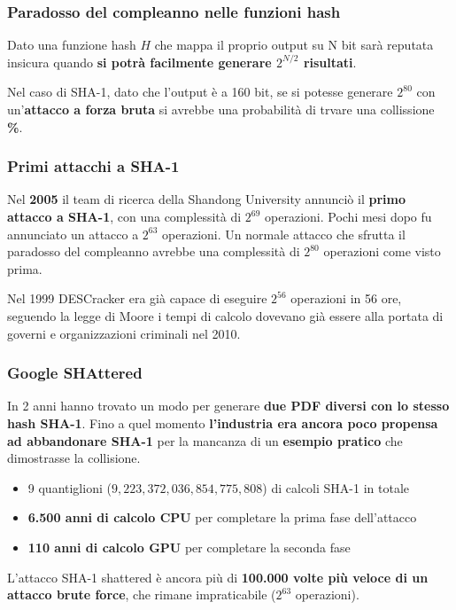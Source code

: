 \begin{frame}
	\frametitle{Paradosso del compleanno nelle funzioni hash}

	Dato una funzione hash \(H\) che mappa il proprio output su N bit sarà reputata insicura quando \textbf{si potrà facilmente generare $2^{N/2}$ risultati}.

	\vspace{1cm}

	Nel caso di SHA-1, dato che l'output è a 160 bit, se si potesse generare $2^{80}$ con un'\textbf{attacco a forza bruta} si avrebbe una probabilità di trvare una collissione \textbf{\%}.
\end{frame}


\begin{frame}
	\frametitle{Primi attacchi a SHA-1}
	Nel \textbf{2005} il team di ricerca della Shandong University annunciò il \textbf{primo attacco a SHA-1}, con una complessità di \(2^{69}\) operazioni.
	Pochi mesi dopo fu annunciato un attacco a \(2^{63}\) operazioni.
	Un normale attacco che sfrutta il paradosso del compleanno avrebbe una complessità di \(2^{80}\) operazioni come visto prima.

	\vspace{1cm}

	Nel 1999 DESCracker era già capace di eseguire \(2^{56}\) operazioni in 56 ore, seguendo la legge di Moore i tempi di calcolo dovevano già essere alla portata di governi e organizzazioni criminali nel 2010.
\end{frame}


\begin{frame}
	\frametitle{Google SHAttered}

	In 2 anni hanno trovato un modo per generare \textbf{due PDF diversi con lo stesso hash SHA-1}.
	Fino a quel momento \textbf{l'industria era ancora poco propensa ad abbandonare SHA-1} per la mancanza di un \textbf{esempio pratico} che dimostrasse la collisione.
	\begin{itemize}
		\item 9 quantiglioni (\(9,223,372,036,854,775,808\)) di calcoli SHA-1 in totale
		\item \textbf{6.500 anni di calcolo CPU} per completare la prima fase dell'attacco
		\item \textbf{110 anni di calcolo GPU} per completare la seconda fase
	\end{itemize}

	L'attacco SHA-1 shattered è ancora più di \textbf{100.000 volte più veloce di un attacco brute force}, che rimane impraticabile (\(2^{63}\) operazioni).
\end{frame}

